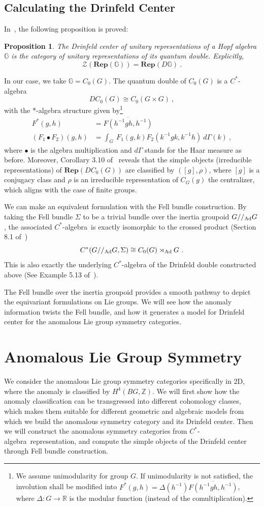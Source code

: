 \documentclass[a4paper,11pt]{article}
\newtheorem{prop}[lemma]{Proposition}
\newcommand{\Rep}{\textbf{Rep}}
\newcommand{\be}{\begin{equation}}
\newcommand{\ee}{\end{equation}}
\newcommand{\ba}{\begin{aligned}}
\newcommand{\ea}{\end{aligned}}
\def\bbG{\mathbb{G}}
\def\bbR{\mathbb{R}}
\def\bbZ{\mathbb{Z}}
\def\CZ{\mathcal{Z}}
\def\calg{$C^*$-algebra\ }
\def\gmg{G//_{\rm Ad} G}
\begin{document}
\subsection{Calculating the Drinfeld Center}
In~\cite{hataishi2025categorical,Neshveyev2016}, the following proposition is proved:
\begin{prop}
    The Drinfeld center of unitary representations of a Hopf algebra $\bbG$ is the category of unitary representations of its quantum double. Explicitly,
    \be \CZ(\Rep(\bbG)) = \Rep(D\bbG)  \ . \ee
\end{prop}
In our case, we take $\bbG = C_0(G)$. The quantum double of $C_0(G)$ is a $C^*$-algebra~\cite{Koornwinder:1996uq}
\be
DC_0(G) \cong C_0(G\times G)\ , 
\ee 
with the $*$-algebra structure given by\footnote{We assume unimodularity for group $G$. If unimodularity is not satisfied, the involution shall be modified into $F^*(g,h) = \Delta(h^{-1})\overline{F(h^{-1}gh,h^{-1})}$, where $\Delta:G\to \bbR$ is the modular function (instead of the comultiplication).}
\be\ba
F^*(g,h) &= \overline{F(h^{-1}gh,h^{-1})}\\
(F_1\bullet F_2)(g,h) &= \int_G \  F_1(g,k) F_2(k^{-1}gk , k^{-1}h) \ d\Gamma(k) \ ,
\ea\ee
where $\bullet$ is the algebra multiplication and $d\Gamma$ stands for the Haar measure as before. 
Moreover, Corollary 3.10 of~\cite{Koornwinder:1996uq} reveals that 
the simple objects (irreducible representations) of $\Rep(DC_0(G))$ are classified by $([g],\rho)$, where $[g]$ is a conjugacy class and $\rho$ is an irreducible representation of $C_G(g)$ the centralizer, which aligns with the case of finite groups.

We can make an equivalent formulation with the Fell bundle construction. By taking the Fell bundle $\Sigma$ to be a trivial bundle over the inertia groupoid $\gmg$, the associated \calg is exactly isomorphic to the crossed product (Section 8.1 of~\cite{Kaliszewski:2008})
\be  C^*( \gmg ,\Sigma )  \cong  C_0(G)\rtimes_{\rm Ad} G \ . \ee
This is also exactly the underlying $C^*$-algebra of the Drinfeld double constructed above (See Example 5.13 of~\cite{Roy:2015}).

The Fell bundle over the inertia groupoid provides a smooth pathway to depict the equivariant formulations on Lie groups. We will see how the anomaly information twists the Fell bundle, and how it generates a model for Drinfeld center for the anomalous Lie group symmetry categories.

\section{Anomalous Lie Group Symmetry}\label{sec:anomalous}
We consider the anomalous Lie group symmetry categories specifically in $2$D, where the anomaly is classified by $H^4(BG,\bbZ)$. 
We will first show how the anomaly classification can be transgressed into different cohomology classes, which makes them suitable for different geometric and algebraic models from which we build the anomalous symmetry category and its Drinfeld center. Then we will construct the anomalous symmetry categories from \calg representation, and compute the simple objects of the Drinfeld center through Fell bundle construction.
\end{document}
